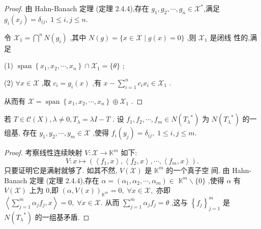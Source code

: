 \documentclass[lang=cn,newtx,10pt,scheme=chinese,thmcnt=chapter]{elegantbook}
\begin{document}
\begin{proof}
    由 Hahn-Banach 定理 (定理 2.4.4),存在 \( {g}_{1},{g}_{2},\cdots ,{g}_{n} \in \mathcal{X}^*\),满足
\( {g}_{i}\left( {x}_{j}\right)  = {\delta }_{ij},\;1 \leq  i,j \leq  n. \)

令 \( {\mathcal{X}}_{1} = \mathop{\bigcap }\limits^{n}N\left( {g}_{i}\right) \) ,其中 \( N\left( g\right)  = \{ x \in  \mathcal{X} \mid  g\left( x\right)  = 0\} \) ,则 \( {\mathcal{X}}_{1} \) 是闭线
性的,满足

(1) \( \operatorname{span}\left\{  {{x}_{1},{x}_{2},\cdots ,{x}_{n}}\right\}   \cap  {\mathcal{X}}_{1} = \{ \theta \} \) ;

(2) \( \forall x \in  \mathcal{X} \) ,取 \( {c}_{i} = {g}_{i}\left( x\right) \) ,有 \( x - \mathop{\sum }\limits_{{i = 1}}^{n}{c}_{i}{x}_{i} \in  {\mathcal{X}}_{1} \) .

从而有 \( \mathcal{X} = \operatorname{span}\left\{  {{x}_{1},{x}_{2},\cdots ,{x}_{n}}\right\}   \oplus  {\mathcal{X}}_{1} \) .
\end{proof}
\begin{lemma}
   若 \(T \in  \mathcal{C}\left( X\right) ,\lambda  \neq  0,{T}_{\lambda } = {\lambda I} - T\) . 设 \( {f}_{1},{f}_{2},\cdots ,{f}_{m} \in \)\( N\left( {T_\lambda}^{ * }\right) \) 为 \( N\left( {T_\lambda}^{ * }\right) \) 的一组基,   存在 \( {y}_{1},{y}_{2},\cdots ,{y}_{m} \in  \mathcal{X} \) ,使得
\( {f}_{i}\left( {y}_{j}\right)  = {\delta }_{ij},\;1 \leq  i,j \leq  m. \)
\end{lemma}
\begin{proof}
    考察线性连续映射 \( V : \mathcal{X} \rightarrow  {\mathbb{K}}^{m} \) 如下:
\[V : x \mapsto  \left( {\left\langle  {{f}_{1},x}\right\rangle  ,\left\langle  {{f}_{2},x}\right\rangle  ,\cdots ,\left\langle  {{f}_{m},x}\right\rangle  }\right) . \]
只要证明它是满射就够了. 如其不然, \( V\left( \mathcal{X}\right) \) 是 \( {\mathbb{K}}^{m} \) 的一个真子空
间. 由 Hahn-Banach 定理 (定理 2.4.4),存在 \( \alpha  = \left( {{\alpha }_{1},{\alpha }_{2},\cdots ,{\alpha }_{m}}\right)  \in \)
\( {\mathbb{K}}^{m} \smallsetminus  \{ 0\} \) ,使得 \( \alpha \) 有 \( V\left( \mathcal{X}\right) \) 上为 0,即
\( {\left( \alpha ,V\left( x\right) \right) }_{{\mathbb{K}}^{m}} = 0,\;\forall x \in  \mathcal{X}, \)
亦即 \( \left\langle  {\mathop{\sum }\limits_{{j = 1}}^{m}{\alpha }_{j}{f}_{j},x}\right\rangle   = 0,\;\forall x \in  \mathcal{X}. \)
从而 \( \mathop{\sum }\limits_{{j = 1}}^{m}{\alpha }_{j}{f}_{j} = \theta \) ,这与 \( {\left\{  {f}_{j}\right\}  }_{j = 1}^{m} \) 是 \( N\left( {T_\lambda}^{ * }\right) \) 的一组基矛盾.
\end{proof}
\end{document}
